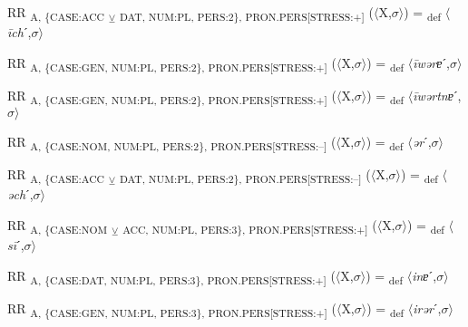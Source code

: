 {\begin{exe}
 RR \textsubscript{A, \{CASE:ACC} \textsubscript{${\veebar}$}\textsubscript{ DAT, NUM:PL, PERS:2\}, PRON.PERS[STRESS:+]} ($\langle$X,$\sigma $$\rangle$) = \textsubscript{def} $\langle$\textit{\=ich}ˊ,$\sigma $$\rangle$
\end{exe}

\begin{exe}
 RR \textsubscript{A, \{CASE:GEN, NUM:PL, PERS:2\}, PRON.PERS[STRESS:+]} ($\langle$X,$\sigma $$\rangle$) = \textsubscript{def} $\langle$\textit{\=iwərɐ}ˊ,$\sigma $$\rangle$
\end{exe}

\begin{exe}
 RR \textsubscript{A, \{CASE:GEN, NUM:PL, PERS:2\}, PRON.PERS[STRESS:+]} ($\langle$X,$\sigma $$\rangle$) = \textsubscript{def} $\langle$\textit{\=iwərtnɐ}ˊ,$\sigma $$\rangle$
\end{exe}

\begin{exe}
 RR \textsubscript{A, \{CASE:NOM, NUM:PL, PERS:2\}, PRON.PERS[STRESS:–]} ($\langle$X,$\sigma $$\rangle$) = \textsubscript{def} $\langle$\textit{ər}ˊ,$\sigma $$\rangle$
\end{exe}

\begin{exe}
 RR \textsubscript{A, \{CASE:ACC} \textsubscript{${\veebar}$}\textsubscript{ DAT, NUM:PL, PERS:2\}, PRON.PERS[STRESS:–]} ($\langle$X,$\sigma $$\rangle$) = \textsubscript{def} $\langle$\textit{əch}ˊ,$\sigma $$\rangle$
\end{exe}

\begin{exe}
 RR \textsubscript{A, \{CASE:NOM} \textsubscript{${\veebar}$}\textsubscript{ ACC, NUM:PL, PERS:3\}, PRON.PERS[STRESS:+]} ($\langle$X,$\sigma $$\rangle$) = \textsubscript{def} $\langle$\textit{s\=i}ˊ,$\sigma $$\rangle$
\end{exe}

\begin{exe}
 RR \textsubscript{A, \{CASE:DAT, NUM:PL, PERS:3\}, PRON.PERS[STRESS:+]} ($\langle$X,$\sigma $$\rangle$) = \textsubscript{def} $\langle$\textit{inɐ}ˊ,$\sigma $$\rangle$
\end{exe}

\begin{exe}
 RR \textsubscript{A, \{CASE:GEN, NUM:PL, PERS:3\}, PRON.PERS[STRESS:+]} ($\langle$X,$\sigma $$\rangle$) = \textsubscript{def} $\langle$\textit{irər}ˊ,$\sigma $$\rangle$
\end{exe}

}
